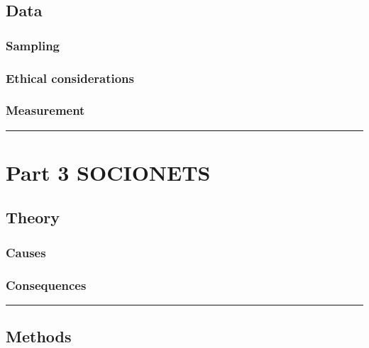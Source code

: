 \documentclass[
]{book}
\begin{document}
\hypertarget{data-1}{%
\chapter{Data}\label{data-1}}

\hypertarget{sampling-1}{%
\section{Sampling}\label{sampling-1}}

\hypertarget{ethical-considerations-1}{%
\section{Ethical considerations}\label{ethical-considerations-1}}

\hypertarget{measurement-1}{%
\section{Measurement}\label{measurement-1}}

\begin{center}\rule{0.5\linewidth}{0.5pt}\end{center}

\hypertarget{part-part-3-socionets}{%
\part{Part 3 SOCIONETS}\label{part-part-3-socionets}}

\hypertarget{theory-2}{%
\chapter{Theory}\label{theory-2}}

\hypertarget{causes-3}{%
\section{Causes}\label{causes-3}}

\hypertarget{consequences-3}{%
\section{Consequences}\label{consequences-3}}

\begin{center}\rule{0.5\linewidth}{0.5pt}\end{center}

\hypertarget{methods-2}{%
\chapter{Methods}\label{methods-2}}
\end{document}
